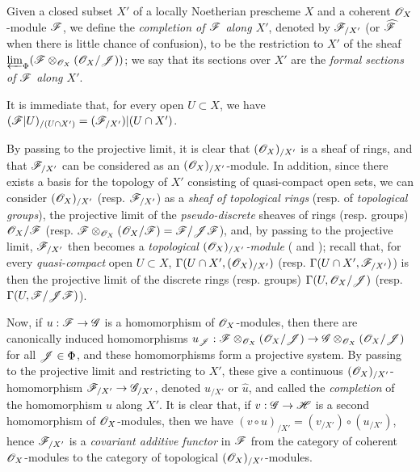 \begin{definition}[10.8.4]
\label{1.10.8.4}
Given a closed subset $X'$ of a locally Noetherian prescheme $X$ and a coherent $\mathscr{O}_X$-module $\mathscr{F}$, we define the \emph{completion of $\mathscr{F}$ along $X'$}, denoted by $\mathscr{F}_{/X'}$ (or $\widehat{\mathscr{F}}$ when there is little chance of confusion), to be the restriction to $X'$ of the sheaf
$\varprojlim_\Phi(\mathscr{F}\otimes_{\mathscr{O}_X}(\mathscr{O}_X/\mathscr{J}))$; we say that its sections over $X'$ are the \emph{formal sections of $\mathscr{F}$ along $X'$}.
\end{definition}

It is immediate that, for every open $U\subset X$, we have $(\mathscr{F}|U)_{/(U\cap X')}=(\mathscr{F}_{/X'})|(U\cap X')$.

By passing to the projective limit, it is clear that $(\mathscr{O}_X)_{/X'}$ is a sheaf of rings, and that $\mathscr{F}_{/X'}$ can be considered as an $(\mathscr{O}_X)_{/X'}$-module.
In addition, since there exists a basis for the topology of $X'$ consisting of quasi-compact open sets, we can consider $(\mathscr{O}_X)_{/X'}$ (resp. $\mathscr{F}_{/X'}$) as a \emph{sheaf of topological rings} (resp. of \emph{topological groups}), the projective limit of the \emph{pseudo-discrete} sheaves of rings (resp. groups) $\mathscr{O}_X/\mathscr{F}$ (resp. $\mathscr{F}\otimes_{\mathscr{O}_X}(\mathscr{O}_X/\mathscr{F})=\mathscr{F}/\mathscr{J}\mathscr{F}$), and, by passing to the projective limit, $\mathscr{F}_{/X'}$ then becomes a \emph{topological $(\mathscr{O}_X)_{/X'}$-module} ( and ); recall that, for every \emph{quasi-compact} open $U\subset X$, $\Gamma(U\cap X',(\mathscr{O}_X)_{/X'})$ (resp. $\Gamma(U\cap X',\mathscr{F}_{/X'})$) is then the projective limit of the discrete rings (resp. groups) $\Gamma(U,\mathscr{O}_X/\mathscr{J})$ (resp. $\Gamma(U,\mathscr{F}/\mathscr{J}\mathscr{F})$).

Now, if $u:\sh{F}\to\sh{G}$ is a homomorphism of $\mathscr{O}_X$-modules, then there are canonically induced homomorphisms $u_\sh{J}:\sh{F}\otimes_{\sh{O}_X}(\sh{O}_X/\sh{J})\to\sh{G}\otimes_{\sh{O}_X}(\sh{O}_X/\sh{J})$ for all $\mathscr{J}\in\Phi$, and these homomorphisms form a projective system.
By passing to the projective limit and restricting to $X'$, these give a continuous $(\mathscr{O}_X)_{/X'}$-homomorphism $\sh{F}_{/X'}\to\sh{G}_{/X'}$, denoted $u_{/X'}$ or $\widehat{u}$, and called the \emph{completion} of the homomorphism $u$ along $X'$.
It is clear that, if $v:\sh{G}\to\sh{H}$ is a second homomorphism of $\mathscr{O}_X$-modules, then we have $(v\circ u)_{/X'}=(v_{/X'})\circ(u_{/X'})$, hence $\mathscr{F}_{/X'}$ is a \emph{covariant additive functor} in $\mathscr{F}$ from the category of coherent $\mathscr{O}_X$-modules to the category of topological $(\mathscr{O}_X)_{/X'}$-modules.

